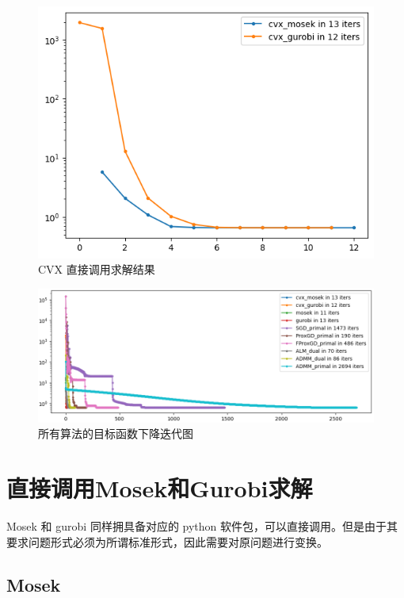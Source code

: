 \documentclass[journal, a4paper]{IEEEtran}
\begin{document}
\begin{figure}[H]
    \centering
    \includegraphics[width=0.8\columnwidth]{img/cvx-mosek-gurobi.png}
    {\centering \small \caption{CVX 直接调用求解结果\label{fig:CVX1}}}
\end{figure}

\begin{figure}[htbp]
    \centering
    \includegraphics[width=1.7\columnwidth]{img/test-all.png    }
    {\centering \small \caption{所有算法的目标函数下降迭代图\label{fig:all}}}
\end{figure}

\section{\textbf{直接调用Mosek和Gurobi求解}}
Mosek 和 gurobi 同样拥具备对应的 python 软件包，可以直接调用。但是由于其要求问题形式必须为所谓标准形式，因此需要对原问题进行变换。

\subsection{\textbf{Mosek}}
\end{document}
